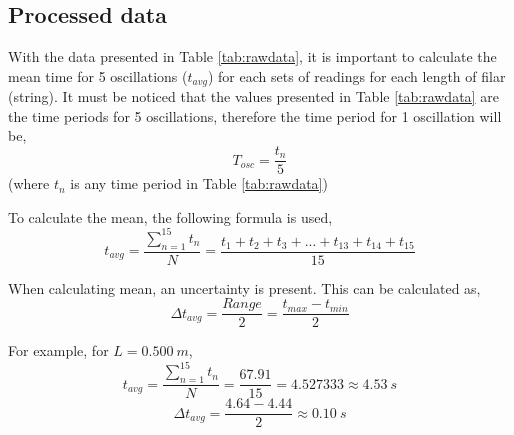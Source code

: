 \documentclass[a4paper,12pt]{article}
\theoremstyle{definition}
\begin{document}
\subsection{Processed data}
With the data presented in Table \ref{tab:rawdata}, it is important to calculate the mean time for 5 oscillations ($t_{avg}$) for each sets of readings for each length of filar (string). It must be noticed that the values presented in Table \ref{tab:rawdata} are the time periods for 5 oscillations, therefore the time period for 1 oscillation will be,
\begin{equation}
	T_{osc}=\frac{t_n}{5}
\end{equation} 
(where $t_n$ is any time period in Table \ref{tab:rawdata})

To calculate the mean, the following formula is used,
\begin{equation}
	t_{avg} = \frac{\sum\limits_{n=1}^{15} t_n}{N}=\frac{t_1+t_2+t_3 + ... + t_{13} + t_{14} + t_{15}}{15}
\end{equation}

When calculating mean, an uncertainty is present. This can be calculated as,
\begin{equation}
	\Delta t_{avg}=\frac{Range}{2}=\frac{t_{max}-t_{min}}{2}
\end{equation} 

For example, for $L=\SI{0.500}{m}$, 
\begin{equation}
	t_{avg} = \frac{\sum\limits_{n=1}^{15} t_n}{N}=\frac{67.91}{15}=4.527333 \approx \SI{4.53}{s}
\end{equation}
\begin{equation}
	\Delta t_{avg} = \frac{4.64-4.44}{2}\approx \SI{0.10}{s}
\end{equation}
\end{document}
